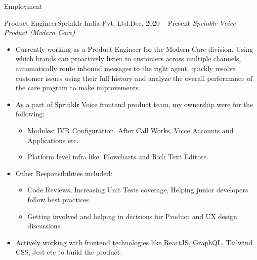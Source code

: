 \documentclass[]{format}
\begin{document}
	\makeheader
	\vspace{-3pt}
	\begin{cvsection}{Employment}
	
	    \vspace{2pt}
	
	    \begin{cvsubsection}{Product Engineer}{Sprinklr India Pvt. Ltd.}{Dec, 2020 – Present}
			\textit{Sprinklr Voice Product (Modern Care)}
			\begin{itemize}
				\item Currently working as a Product Engineer for the Modern-Care division. Using which brands can proactively listen to customers across multiple channels, automatically route inbound messages to the right agent, quickly resolve customer issues using their full history and analyze the overall performance of the care program to make improvements.
				\item As a part of Sprinklr Voice frontend product team, my ownership were for the following:
				\begin{itemize}
				    \item Modules: IVR Configuration, After Call Works, Voice Accounts and Applications etc.
				    \item Platform level infra like: Flowcharts and Rich Text Editors.
				\end{itemize}
				\item Other Responsibilities included:
				\begin{itemize}
				    \item Code Reviews, Increasing Unit Tests coverage, Helping junior developers follow best practices
				    \item Getting involved and helping in decisions for Product and UX design discussions
				\end{itemize}
				\item Actively working with frontend technologies like ReactJS, GraphQL, Tailwind CSS, Jest etc to build the product.
			\end{itemize}
		\end{cvsubsection}
	

\end{cvsection}
\end{document}
